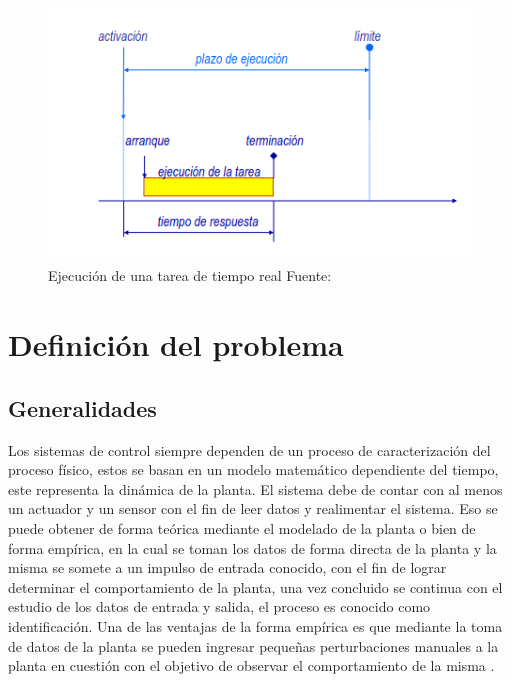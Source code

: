 \documentclass[12pt]{article}
\begin{document}
\begin{figure}[!ht]
  \centering
  \includegraphics[scale=0.5]{diagramas/tiempo_real.png}
  \caption{Ejecución de una tarea de tiempo real Fuente: \cite{de2000introduccion}}
  \label{fig:diagrama_tiempo_real}
\end{figure}

\newpage

\section{Definición del problema}

\subsection{Generalidades}

Los sistemas de control siempre dependen de un proceso de caracterización del proceso físico, estos se basan en un modelo matemático dependiente del tiempo, este representa la dinámica de la planta. El sistema debe de contar con al menos un actuador y un sensor con el fin de leer datos y realimentar el sistema. Eso se puede obtener de forma teórica mediante el modelado de la planta o bien de forma empírica, en la cual se toman los datos de forma directa de la planta y la misma se somete a un impulso de entrada conocido, con el fin de lograr determinar el comportamiento de la planta, una vez concluido se continua con el estudio de los datos de entrada y salida, el proceso es conocido como identificación. Una de las ventajas de la forma empírica es que mediante la toma de datos de la planta se pueden ingresar pequeñas perturbaciones manuales a la planta en cuestión con el objetivo de observar el comportamiento de la misma \cite{15_tec}.
\end{document}

